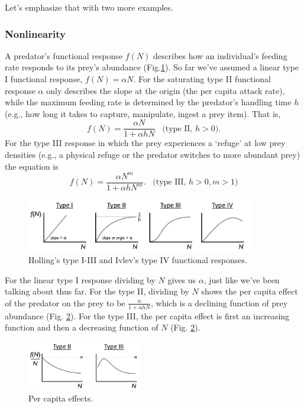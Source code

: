 \documentclass[10pt,letterpaper]{article}
\begin{document}
Let's emphasize that with two more examples.


\subsubsection{Nonlinearity}
\label{Nonlinearity}
A predator's functional response $f(N)$ describes how an individual's feeding rate responds to its prey's abundance (Fig.\ref{fig:FuncResp}).
So far we've assumed a linear type I functional response, $f(N)=\alpha N$.  For the saturating type II functional response $\alpha$ only describes the slope at the origin (the per capita attack rate), while the maximum feeding rate is determined by the predator's handling time $h$ (e.g., how long it takes to capture, manipulate, ingest a prey item).  That is,
\begin{equation}
f(N)=\frac{\alpha N}{1+\alpha h N} \;\;\; \text{(type II, $h>0$)}.
\end{equation}
For the type III response in which the prey experiences a `refuge' at low prey densities (e.g., a physical refuge or the predator switches to more abundant prey) the equation is
\begin{equation}
f(N)=\frac{\alpha N^m}{1+\alpha h N^m}. \;\;\; \text{(type III, $h>0, m>1$)}
\end{equation}

\begin{figure}[ht!]
\centering
\includegraphics[width=100mm]{figs/FunctionalResponses.png}
	\caption{Holling's type I-III and Ivlev's type IV functional responses.}
	\label{fig:FuncResp}
\end{figure}


For the linear type I response dividing by $N$ gives us $\alpha$, just like we've been talking about thus far.  For the type II, dividing by $N$ shows the per capita effect of the predator on the prey to be $\tfrac{\alpha}{1+\alpha h N}$, which is a declining function of prey abundance (Fig. \ref{fig:PerCapMort}).  For the type III, the per capita effect is first an increasing function and then a decreasing function of $N$ (Fig. \ref{fig:PerCapMort}).

\begin{figure}[ht!]
\centering
\includegraphics[width=50mm]{figs/PerCapMort.png}
	\caption{Per capita effects.}
	\label{fig:PerCapMort}
\end{figure}
\end{document}
